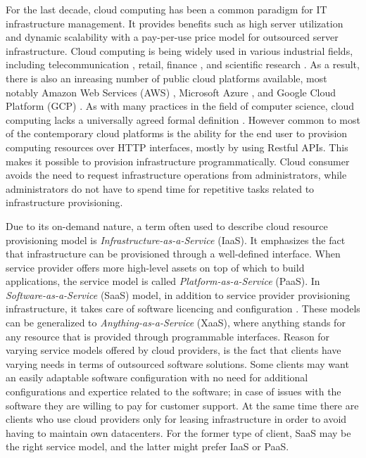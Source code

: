 For the last decade, cloud computing has been a common paradigm for IT
infrastructure management. It provides benefits such as high server utilization
and dynamic scalability with a pay-per-use price model for outsourced server
infrastructure. Cloud computing is being widely used in various industrial
fields, including telecommunication \cite{china-mobile}, retail, finance
\cite{kanso2017enhancing}, and scientific research \cite{bell2015scaling}. As a
result, there is also an inreasing number of public cloud platforms available,
most notably Amazon Web Services (AWS) \citep{aws}, Microsoft Azure
\cite{azure}, and Google Cloud Platform (GCP) \cite{gcp}. As with many
practices in the field of computer science, cloud computing lacks a universally
agreed formal definition \cite{armbrust2010view}. However common to most of the
contemporary cloud platforms is the ability for the end user to provision
computing resources over HTTP interfaces, mostly by using Restful APIs. This
makes it possible to provision infrastructure programmatically. Cloud consumer
avoids the need to request infrastructure operations from administrators, while
administrators do not have to spend time for repetitive tasks related to
infrastructure provisioning.

Due to its on-demand nature, a term often used to describe cloud resource
provisioning model is \textit{Infrastructure-as-a-Service} (IaaS). It
emphasizes the fact that infrastructure can be provisioned through a
well-defined interface. When service provider offers more high-level assets on
top of which to build applications, the service model is called
\textit{Platform-as-a-Service} (PaaS). In \textit{Software-as-a-Service} (SaaS)
model, in addition to service provider provisioning infrastructure, it takes
care of software licencing and configuration \cite{sefraoui2012openstack}.
These models can be generalized to \textit{Anything-as-a-Service} (XaaS), where
anything stands for any resource that is provided through programmable
interfaces. Reason for varying service models offered by cloud providers, is
the fact that clients have varying needs in terms of outsourced software
solutions. Some clients may want an easily adaptable software configuration
with no need for additional configurations and expertice related to the
software; in case of issues with the software they are willing to pay for
customer support. At the same time there are clients who use cloud providers
only for leasing infrastructure in order to avoid having to maintain own
datacenters. For the former type of client, SaaS may be the right service
model, and the latter might prefer IaaS or PaaS.

